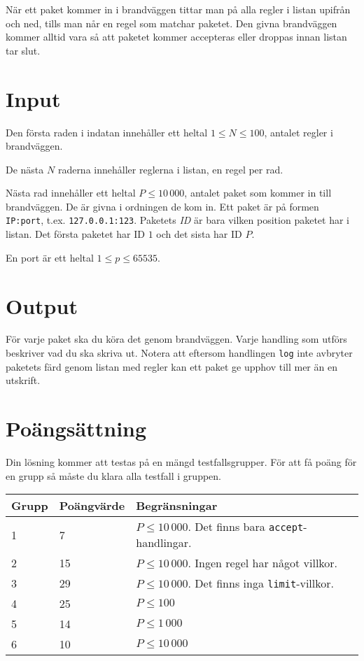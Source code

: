 När ett paket kommer in i brandväggen tittar man på alla regler i listan upifrån och ned, tills man når en regel som matchar paketet. Den givna brandväggen kommer alltid vara
så att paketet kommer accepteras eller droppas innan listan tar slut.

\section*{Input}
Den första raden i indatan innehåller ett heltal $1 \le N \le 100$, antalet regler i brandväggen.

De nästa $N$ raderna innehåller reglerna i listan, en regel per rad.

Nästa rad innehåller ett heltal $P \le 10\,000$, antalet paket som kommer in till brandväggen. De är givna i ordningen de kom in.
Ett paket är på formen \texttt{IP:port}, t.ex. \texttt{127.0.0.1:123}. Paketets \emph{ID} är bara vilken position paketet har i listan. Det första paketet har ID $1$ och det sista har ID $P$.

En port är ett heltal $1 \le p \le 65535$.

\section*{Output}
För varje paket ska du köra det genom brandväggen. Varje handling som utförs beskriver vad du ska skriva ut. Notera att eftersom handlingen \texttt{log} inte avbryter
paketets färd genom listan med regler kan ett paket ge upphov till mer än en utskrift.

\section*{Poängsättning}
Din lösning kommer att testas på en mängd testfallsgrupper. För att få poäng för en grupp så måste du klara alla testfall i gruppen.

\begin{tabular}{| l | l | l |}
	\hline
	Grupp & Poängvärde & Begränsningar\\ \hline
	1     & 7          & $P \le 10\,000$. Det finns bara \texttt{accept}-handlingar.  \\ \hline
	2     & 15         & $P \le 10\,000$. Ingen regel har något villkor. \\ \hline
	3     & 29         & $P \le 10\,000$. Det finns inga \texttt{limit}-villkor. \\ \hline
	4     & 25         & $P \le 100$ \\ \hline
	5     & 14         & $P \le 1\,000$ \\ \hline
	6     & 10         & $P \le 10\,000$ \\ \hline
\end{tabular}
